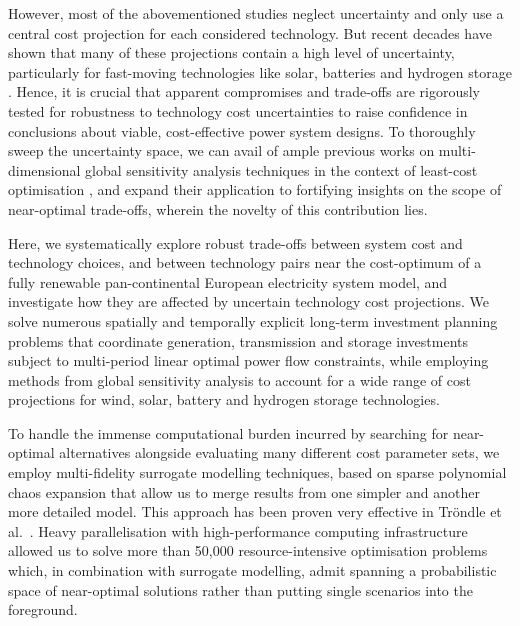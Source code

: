 However, most of the abovementioned studies neglect uncertainty and only use a
central cost projection for each considered technology. But recent decades have
shown that many of these projections contain a high level of uncertainty,
particularly for fast-moving technologies like solar, batteries and hydrogen
storage \cite{}. Hence, it is crucial that apparent compromises and trade-offs
are rigorously tested for robustness to technology cost uncertainties to raise
confidence in conclusions about viable, cost-effective power system designs. To
thoroughly sweep the uncertainty space, we can avail of ample previous works on
multi-dimensional global sensitivity analysis techniques in the context of
least-cost optimisation \cite{trondle_trade-offs_2020,
mavromatidis_uncertainty_2018, pizarro-alonso_uncertainties_2019,
fais_impact_2016, usher_value_2015}, and expand their application to fortifying
insights on the scope of near-optimal trade-offs, wherein the novelty of this contribution
lies.


Here, we systematically explore robust trade-offs between system
cost and technology choices, and between technology pairs near the cost-optimum
of a fully renewable pan-continental European electricity system model, and
investigate how they are affected by uncertain technology cost projections. We
solve numerous spatially and temporally explicit long-term investment planning
problems that coordinate generation, transmission and storage investments
subject to multi-period linear optimal power flow constraints, while employing
methods from global sensitivity analysis to account for a wide range of cost
projections for wind, solar, battery and hydrogen storage technologies.


To handle the immense computational burden incurred by searching for
near-optimal alternatives alongside evaluating many different cost parameter
sets, we employ multi-fidelity surrogate modelling techniques, based on sparse
polynomial chaos expansion that allow us to merge results from one simpler and
another more detailed model. This approach has been proven very effective in
Tröndle et al.~\cite{trondle_trade-offs_2020}. Heavy parallelisation with
high-performance computing infrastructure allowed us to solve more than 50,000
resource-intensive optimisation problems which, in combination with surrogate
modelling, admit spanning a probabilistic space of near-optimal solutions rather
than putting single scenarios into the foreground.

